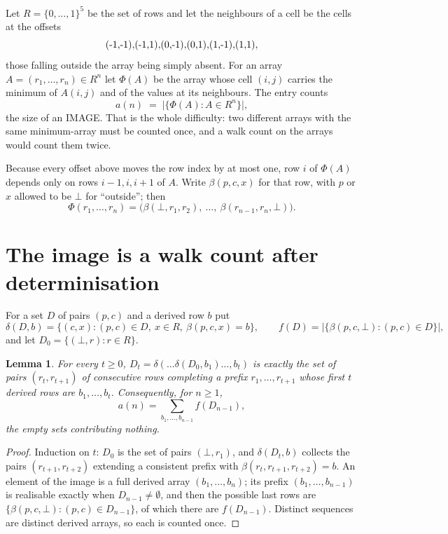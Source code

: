 \documentclass[11pt,a4paper]{article}
\theoremstyle{plain}
\newtheorem{lemma}[theorem]{Lemma}
\theoremstyle{definition}
\begin{document}
Let $R=\{0,\dots,1\}^{5}$ be the set of rows and let the neighbours of
a cell be the cells at the offsets
\[
$(-1,-1)$, $(-1,1)$, $(0,-1)$, $(0,1)$, $(1,-1)$, $(1,1)$,
\]
those falling outside the array being simply absent. For an array
$A=(r_1,\dots,r_n)\in R^n$ let $\Phi(A)$ be the array whose cell $(i,j)$ carries the
minimum of $A(i,j)$ and of the values at its neighbours. The entry counts
\[
a(n)\;=\;\bigl|\{\Phi(A):A\in R^n\}\bigr| ,
\]
the size of an IMAGE. That is the whole difficulty: two different arrays with the same
minimum-array must be counted once, and a walk count on the arrays would count them twice.

Because every offset above moves the row index by at most one, row $i$ of
$\Phi(A)$ depends only on rows $i-1,i,i+1$ of $A$. Write $\beta(p,c,x)$ for that row, with $p$
or $x$ allowed to be $\bot$ for ``outside''; then
\[
\Phi(r_1,\dots,r_n)=\bigl(\beta(\bot,r_1,r_2),\ \dots,\ \beta(r_{n-1},r_n,\bot)\bigr).
\]

\section{The image is a walk count after determinisation}

For a set $D$ of pairs $(p,c)$ and a derived row $b$ put
\[
\delta(D,b)=\{(c,x):(p,c)\in D,\ x\in R,\ \beta(p,c,x)=b\},\qquad
f(D)=\bigl|\{\beta(p,c,\bot):(p,c)\in D\}\bigr| ,
\]
and let $D_0=\{(\bot,r):r\in R\}$.

\begin{lemma}\label{lem:det}
For every $t\ge0$, $D_t=\delta(\dots\delta(D_0,b_1)\dots,b_t)$ is exactly the set of pairs
$(r_t,r_{t+1})$ of consecutive rows completing a prefix $r_1,\dots,r_{t+1}$ whose first $t$
derived rows are $b_1,\dots,b_t$. Consequently, for $n\ge1$,
\[
a(n)=\sum_{b_1,\dots,b_{n-1}}f(D_{n-1}),
\]
the empty sets contributing nothing.
\end{lemma}

\begin{proof}
Induction on $t$: $D_0$ is the set of pairs $(\bot,r_1)$, and $\delta(D_t,b)$ collects the
pairs $(r_{t+1},r_{t+2})$ extending a consistent prefix with
$\beta(r_t,r_{t+1},r_{t+2})=b$. An element of the image is a full derived array
$(b_1,\dots,b_n)$; its prefix $(b_1,\dots,b_{n-1})$ is realisable exactly when
$D_{n-1}\neq\emptyset$, and then the possible last rows are
$\{\beta(p,c,\bot):(p,c)\in D_{n-1}\}$, of which there are $f(D_{n-1})$. Distinct sequences
are distinct derived arrays, so each is counted once.
\end{proof}
\end{document}
